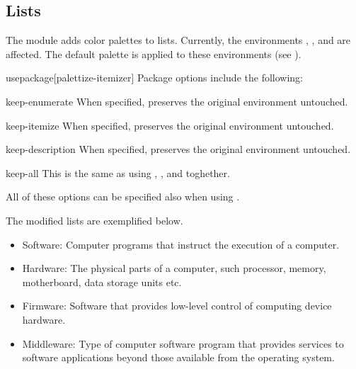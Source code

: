 \documentclass[a4paper, 11pt]{article}
\begin{document}
\subsection{Lists}\label{sec:itemizer}

The module  adds color palettes to lists. Currently, the environments , , and  are affected. The default palette is applied to these environments (see ).

\begin{macro*}{usepackage}{}[palettize-itemizer]
    Package options include the following:

    \begin{option}{keep-enumerate}{}
        When specified,  preserves the original  environment untouched.
    \end{option}

    \begin{option}{keep-itemize}{}
        When specified,  preserves the original  environment untouched.
    \end{option}

    \begin{option}{keep-description}{}
        When specified,  preserves the original  environment untouched.
    \end{option}

    \begin{option}{keep-all}{}
        This is the same as using , , and  toghether.
    \end{option}

    All of these options can be specified also when using \latexinline{\usepackage{palettize}}.
\end{macro*}

The modified lists are exemplified below.

\begin{example}{}
    \begin{itemize}
        \item Software: Computer programs that instruct the execution of a computer.
        \item Hardware: The physical parts of a computer, such processor, memory, motherboard, data storage units etc.
        \item Firmware: Software that provides low-level control of computing device hardware.
        \item Middleware: Type of computer software program that provides services to software applications beyond those available from the operating system.
    \end{itemize}
\end{example}
\end{document}
